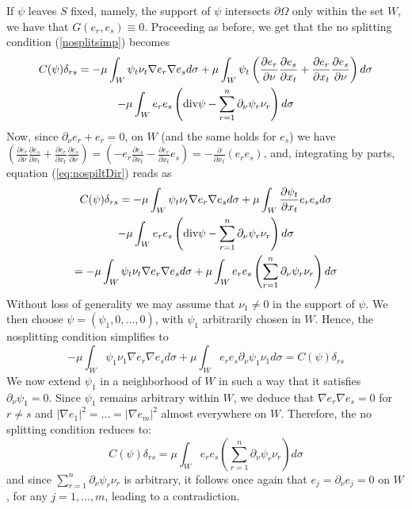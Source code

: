 \documentclass[a4paper,reqno,11pt,oneside]{amsart}
\theoremstyle{plain}
\theoremstyle{plain}
\theoremstyle{plain}
\theoremstyle{remark}
\def\div{\textup{div}}
\begin{document}
If $\psi$ leaves $S$ fixed, namely,  the support of $\psi$ intersects $\partial \Omega$ only within the set $W$, we have that $G( e_r,e_s)\equiv 0$. Proceeding as before, we get that the no splitting condition (\ref{nosplitsimp}) becomes
  \begin{multline}\label{eq:nospiltDir}
 C(\psi)\delta_{rs}=-\mu\int_{W}\psi_t \nu_t \nabla e_r\nabla e_s
 d\sigma
+\mu\int_{W}
\psi_t\left(\frac{\partial e_r}{\partial \nu}\frac{\partial e_s}{\partial x_t}+\frac{\partial e_r}{\partial x_t}\frac{\partial e_s}{\partial \nu}
\right) d\sigma \\
-\mu \int_{W} e_r e_s \left(\div \psi -\sum_{r=1}^n \partial_\nu \psi_r \nu_r\right) d\sigma
\end{multline}
Now, since $\partial_\nu e_r+e_r=0$, on $W$ (and the same holds for $e_s$)  we have $\left(\frac{\partial e_r}{\partial \nu}\frac{\partial e_s}{\partial x_t}+\frac{\partial e_r}{\partial x_t}\frac{\partial e_s}{\partial \nu}
\right)=\left(- e_r\frac{\partial e_s}{\partial x_t}-\frac{\partial e_r}{\partial x_t} e_s
\right)=-\frac{\partial }{\partial x_t}(e_r e_s)$, and, integrating by parts, equation (\ref{eq:nospiltDir}) reads as
\begin{multline*}
 C(\psi)\delta_{rs}=-\mu\int_{W}\psi_t \nu_t \nabla e_r\nabla e_sd\sigma
 +\mu\int_{W}
\frac{\partial \psi_t}{\partial x_t}e_r e_s d\sigma 
\\-\mu \int_{W} e_r e_s \left(\div \psi -\sum_{r=1}^n \partial_\nu \psi_r \nu_r\right) d\sigma\\
=-\mu\int_{W}\psi_t \nu_t \nabla e_r\nabla e_sd\sigma
+\mu \int_{W} e_r e_s \left( \sum_{r=1}^n \partial_\nu \psi_r \nu_r\right) d\sigma
\end{multline*}
Without loss of generality we may assume that $\nu_1 \neq 0$ in the support of $\psi$.  We then  choose $\psi=(\psi_1,0,\dots,0)$, with $\psi_1$ arbitrarily chosen in $W$. Hence, the nosplitting condition simplifies to 
\begin{equation*}
    -\mu\int_{W}\psi_1 \nu_1 \nabla e_r\nabla e_sd\sigma
+\mu \int_{W} e_r e_s  \partial_\nu \psi_1 \nu_1 d\sigma=C(\psi)\delta_{rs}
\end{equation*}
We now extend  $\psi_1$ in a neighborhood of $W$
in such a way that it satisfies  $\partial_\nu \psi_1=0$. Since $\psi_1$ remains arbitrary within  $W$, we deduce that $\nabla e_r\nabla e_s=0$ for $r\neq s$ and $|\nabla e_1|^2=\dots=|\nabla e_m|^2$ almost everywhere on $W$. Therefore, the no splitting condition reduces to:
\begin{equation}
     C(\psi)\delta_{rs}=\mu \int_{W} e_r e_s \left( \sum_{r=1}^n \partial_\nu \psi_r \nu_r\right) d\sigma
\end{equation}
and since $ \sum_{r=1}^n \partial_\nu \psi_r \nu_r$ is arbitrary,  it follows once again that $e_j=\partial_\nu e_j=0$ on $W$, for any $j=1,\dots,m$, leading to a contradiction.
\end{document}
